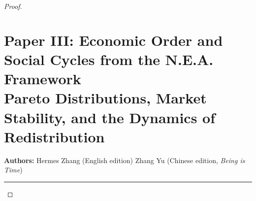 \documentclass{article}
\begin{document}
\begin{proof}
\newpage

\section*{Paper III: Economic Order and Social Cycles from the N.E.A. Framework\\
\large Pareto Distributions, Market Stability, and the Dynamics of Redistribution}
\vspace{0.5cm}

\textbf{Authors:} Hermes Zhang (English edition) \quad Zhang Yu (Chinese edition, \textit{Being is Time})

\vspace{0.5cm}
\noindent\rule{\textwidth}{0.4pt}
\vspace{0.5cm}

\begin{abstract}
In Paper I of this series, the N.E.A. Framework was reformulated with only two rigid axioms—Noether’s theorem (conservation) and the principle of least action (extremal evolution)—and it was shown that the specific form of the enthalpy decomposition emerges from the computational constraints of the system. For economic systems, where agents have finite information‑processing bandwidth, the emergent enthalpy takes a logarithmic form: $Q = k N \ln I + p E(N)$, where $E(N) \propto N$ in a three‑dimensional transaction network. In this paper, we take this logarithmic enthalpy as our starting point and show that it yields the fundamental structure of economic systems: the Pareto (power‑law) distribution of wealth, the stability condition of a market economy, and the cyclical dynamics of inequality and redistribution—the “cycles of order and chaos” described in \textit{Being is Time}. We introduce the concept of \textbf{economic curvature} as a heuristic measure of wealth concentration and define an \textbf{economic speed of light} $c_{\text{econ}}$ as a phenomenological constant representing the maximum rate of information propagation in the transaction network, grounding the analogy with general relativity. The market stability condition emerges as a budget constraint $I < I_c$, whose violation triggers a phase transition analogous to gravitational collapse. This work completes the unification of physical and social sciences under the N.E.A. variational principle, demonstrating that market regularities are not social constructs but emergent consequences of conservation and extremal evolution under finite‑bandwidth and network‑dimension constraints.
\end{abstract}


\end{proof}
\end{document}
